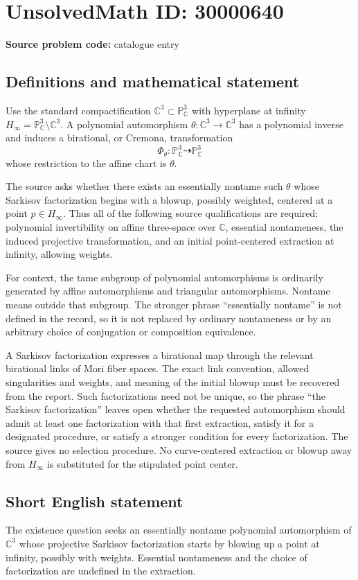 \documentclass[11pt]{article}
\newcommand{\C}{\mathbb{C}}
\newcommand{\PP}{\mathbb{P}}
\begin{document}
\section*{UnsolvedMath ID: 30000640}
\textbf{Source problem code:} catalogue entry
\subsection{Definitions and mathematical statement}
Use the standard compactification $\C^3\subset\PP^3_\C$ with hyperplane at infinity $H_\infty=\PP^3_\C\setminus\C^3$. A polynomial automorphism $\theta:\C^3\to\C^3$ has a polynomial inverse and induces a birational, or Cremona, transformation
\[
 \Phi_\theta:\PP^3_\C\dashrightarrow\PP^3_\C
\]
whose restriction to the affine chart is $\theta$.

The source asks whether there exists an essentially nontame such $\theta$ whose Sarkisov factorization begins with a blowup, possibly weighted, centered at a point $p\in H_\infty$. Thus all of the following source qualifications are required: polynomial invertibility on affine three-space over $\C$, essential nontameness, the induced projective transformation, and an initial point-centered extraction at infinity, allowing weights.

For context, the tame subgroup of polynomial automorphisms is ordinarily generated by affine automorphisms and triangular automorphisms. Nontame means outside that subgroup. The stronger phrase ``essentially nontame'' is not defined in the record, so it is not replaced by ordinary nontameness or by an arbitrary choice of conjugation or composition equivalence.

A Sarkisov factorization expresses a birational map through the relevant birational links of Mori fiber spaces. The exact link convention, allowed singularities and weights, and meaning of the initial blowup must be recovered from the report. Such factorizations need not be unique, so the phrase ``the Sarkisov factorization'' leaves open whether the requested automorphism should admit at least one factorization with that first extraction, satisfy it for a designated procedure, or satisfy a stronger condition for every factorization. The source gives no selection procedure. No curve-centered extraction or blowup away from $H_\infty$ is substituted for the stipulated point center.
\subsection{Short English statement}
The existence question seeks an essentially nontame polynomial automorphism of $\C^3$ whose projective Sarkisov factorization starts by blowing up a point at infinity, possibly with weights. Essential nontameness and the choice of factorization are undefined in the extraction.
\end{document}
